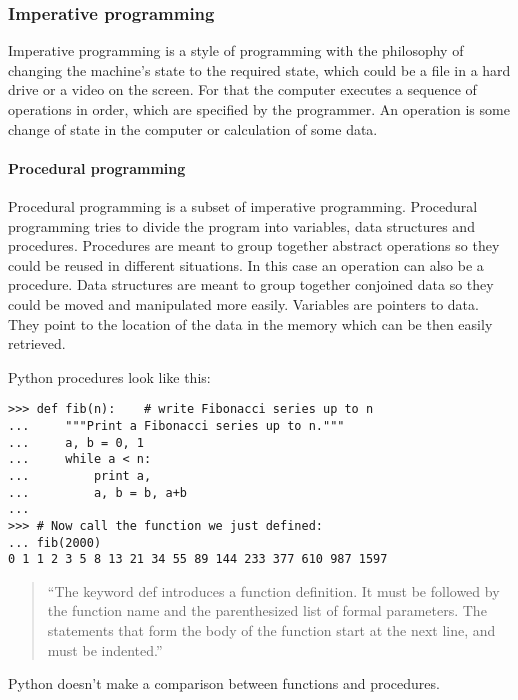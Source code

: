 \subsubsection{Imperative programming}

Imperative programming is a style of programming with the philosophy of changing the machine's state to the required state, which could be a file in a hard drive or a video on the screen. For that the computer executes a sequence of operations in order, which are specified by the programmer. An operation is some change of state in the computer or calculation of some data.

\paragraph{Procedural programming}

Procedural programming is a subset of imperative programming. Procedural
programming tries to divide the program into variables, data structures and
procedures. Procedures are meant to group together abstract operations so they
could be reused in different situations. In this case an operation can also be a
procedure. Data structures are meant to group together conjoined data so they
could be moved and manipulated more easily. Variables are pointers to data. They
point to the location of the data in the memory which can be then easily
retrieved.


\clearpage

Python procedures look like this:
\begin{verbatim}
>>> def fib(n):    # write Fibonacci series up to n
...     """Print a Fibonacci series up to n."""
...     a, b = 0, 1
...     while a < n:
...         print a,
...         a, b = b, a+b
...
>>> # Now call the function we just defined:
... fib(2000)
0 1 1 2 3 5 8 13 21 34 55 89 144 233 377 610 987 1597
\end{verbatim}
\begin{quote}
``The keyword def introduces a function definition. It must be followed by the
function name and the parenthesized list of formal parameters. The statements
that form the body of the function start at the next line, and must be
indented.''\cite[4.6. Defining Functions]{website:python-functions}
\end{quote}
Python doesn't make a comparison between functions and procedures.

